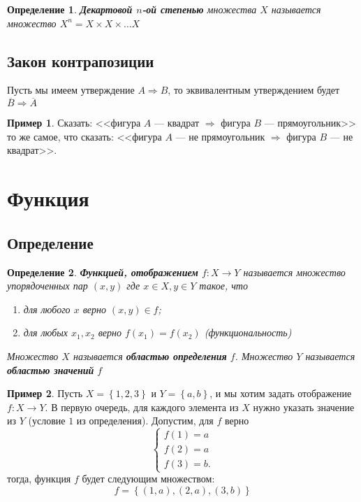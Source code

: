 \documentclass[]{article}
\theoremstyle{theorem}
\newtheorem{dfn}{Определение}
\theoremstyle{definition}
\newtheorem{ex}{Пример}
\begin{document}
	\begin{dfn}
	\textbf{Декартовой $n$-ой степенью} множества $X$ называется множество $X^n=X\times X\times \ldots X$ 
	\end{dfn}
	
	\subsection{Закон контрапозиции}
	
	Пусть мы имеем утверждение $A\Rightarrow B$, то эквивалентным утверждением будет $\overline{B}\Rightarrow \overline{A}$
	
	\begin{ex}
		Сказать: <<фигура $A$ --- квадрат $\Rightarrow$ фигура $B$ --- прямоугольник>> то же самое, что сказать: <<фигура $A$ --- не прямоугольник $\Rightarrow$ фигура $B$ --- не квадрат>>.
	\end{ex}
	
	\section{Функция}
	\subsection{Определение}
	\begin{dfn}
		\textbf{Функцией, отображением} $f:X\rightarrow Y$ называется множество  упорядоченных пар $(x,y)$ где $x\in X, y\in Y$ такое, что 
		\begin{enumerate}
			\item для любого $x$ верно  $(x,y)\in f$; 
			\item для любых $x_1, x_2$ верно  $f(x_1)=f(x_2)$
			(функциональность)
		\end{enumerate}
		Множество $X$ называется \textbf{областью определения} $f$.
		Множество $Y$ называется \textbf{областью значений} $f$
	\end{dfn}
	\begin{ex}
		Пусть $X=\left\{1,2,3\right\}$ и $Y=\left\{a,b\right\}$, и мы хотим задать отображение $f:X\rightarrow Y$. В первую очередь, для каждого элемента из $X$ нужно указать значение из $Y$ (условие $1$ из определения). Допустим, для $f$ верно
	\begin{equation}
	\begin{cases}
	f(1)=a
	\\
	f(2)=a
	\\
	f(3)=b.
\end{cases}
	\end{equation}
тогда, функция $f$ будет следующим множеством:
\begin{equation}
	f=\left\{(1,a),(2,a),(3,b)\right\}
\end{equation}
	\end{ex}
\end{document}
